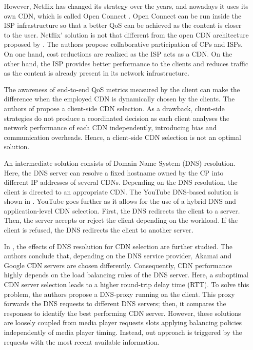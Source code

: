 However, Netflix has changed its strategy over the years, and nowadays it uses its own CDN, which is called Open Connect \cite{botteger2018}. Open Connect can be run inside the ISP infrastructure so that a better QoS can be achieved as the content is closer to the user. Netflix’ solution is not that different from the open CDN architecture proposed by \cite{zhang2014}. The authors propose collaborative participation of CPs and ISPs. On one hand, cost reductions are realized as the ISP acts as a CDN. On the other hand, the ISP provides better performance to the clients and reduces traffic as the content is already present in its network infrastructure.

The awareness of end-to-end QoS metrics measured by the client can make the difference when the employed CDN is dynamically chosen by the clients. The authors of \cite{otto2012} propose a client-side CDN selection. As a drawback, client-side strategies do not produce a coordinated decision as each client analyses the network performance of each CDN independently, introducing bias and communication overheads. Hence, a client-side CDN selection is not an optimal solution.

An intermediate solution consists of Domain Name System (DNS) resolution. Here, the DNS server can resolve a fixed hostname owned by the CP into different IP addresses of several CDNs. Depending on the DNS resolution, the client is directed to an appropriate CDN. The YouTube DNS-based solution is shown in \cite{torres2011}. YouTube goes further as it allows for the use of a hybrid DNS and application-level CDN selection. First, the DNS redirects the client to a server. Then, the server accepts or reject the client depending on the workload. If the client is refused, the DNS redirects the client to another server.

In \cite{goel2015}, the effects of DNS resolution for CDN selection are further studied. The authors conclude that, depending on the DNS service provider, Akamai and Google CDN servers are chosen differently. Consequently, CDN performance highly depends on the load balancing rules of the DNS server. Here, a suboptimal CDN server selection leads to a higher round-trip delay time (RTT). To solve this problem, the authors propose a DNS-proxy running on the client. This proxy forwards the DNS requests to different DNS servers; then, it compares the responses to identify the best performing CDN server. However, these solutions are loosely coupled from media player requests slots applying balancing policies independently of media player timing. Instead, out approach is triggered by the requests with the most recent available information.

